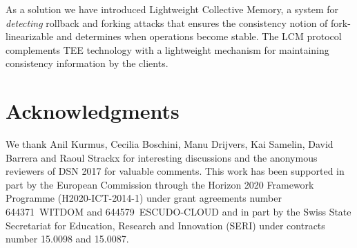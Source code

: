 \documentclass[11pt]{article}
\theoremstyle{plain-boldhead}
\theoremstyle{definition-boldhead}
\newcommand{\pproj}{Lightweight Collective Memory\xspace}
\newcommand{\pp}{LCM\xspace}
\begin{document}
As a solution we have introduced \pproj, a system for \emph{detecting}
rollback and forking attacks that ensures the consistency notion of 
fork-linearizable and determines when operations become stable.  The \pp
protocol complements TEE technology with a lightweight mechanism for
maintaining consistency information by the clients.

\section*{Acknowledgments}

We thank 
Anil Kurmus, Cecilia Boschini, Manu Drijvers, Kai Samelin, David Barrera and Raoul Strackx
for interesting discussions and the anonymous reviewers of DSN 2017
for valuable comments.
This work has been supported in part by the European Commission through the
Horizon 2020 Framework Programme (H2020-ICT-2014-1) under grant agreements
number 644371~WITDOM and 644579~ESCUDO-CLOUD and in part by the Swiss State
Secretariat for Education, Research and Innovation (SERI) under contracts
number 15.0098 and 15.0087.



\balance
\end{document}
